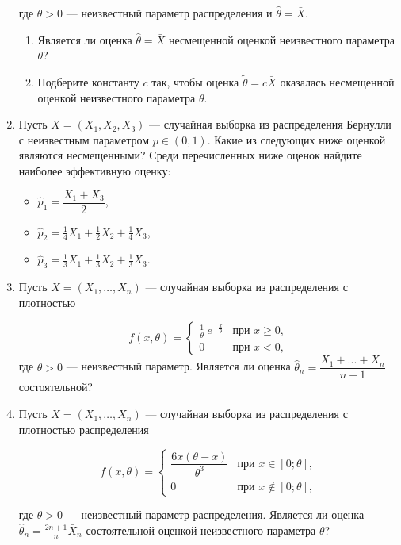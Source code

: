 \begin{enumerate}
где $\theta > 0$ — неизвестный параметр распределения и $\hat{\theta} = \bar{X}$.

\begin{enumerate}
\item Является ли оценка $\hat{\theta} = \bar{X}$ несмещенной оценкой неизвестного параметра $\theta$?
\item Подберите константу $c$ так, чтобы оценка $\tilde{\theta} = c\bar{X}$ оказалась несмещенной оценкой неизвестного параметра $\theta$.
\end{enumerate}

\item Пусть $X = (X_1,X_2,X_3)$ — случайная выборка из распределения Бернулли с неизвестным параметром $p \in (0,1)$. Какие из следующих ниже оценкой являются несмещенными? Среди перечисленных ниже оценок найдите наиболее эффективную оценку:

\begin{itemize}
  \item $\hat{p}_1 = \dfrac{X_1+X_3}{2}$,
  \item $\hat{p}_2 = \frac{1}{4}X_1+\frac{1}{2}X_2+\frac{1}{4}X_3$,
  \item $\hat{p}_3 = \frac{1}{3}X_1+\frac{1}{3}X_2+\frac{1}{3}X_3$.
\end{itemize}

\item Пусть $X=(X_1, \ldots,X_n)$ — случайная выборка из распределения с плотностью

\[
f(x,\theta) =
\begin{cases}
\frac{1}{\theta} \ e^{-\frac{x}{\theta}} & \text{при } x \geq 0, \\
0 & \text{при } x < 0,
\end{cases}
\]
где $\theta > 0$ — неизвестный параметр.
Является ли оценка  $\hat{\theta}_n = \dfrac{X_1+...+X_n}{n+1}$ состоятельной?

\item Пусть $X=(X_1, \ldots ,X_n)$ — случайная выборка из распределения с плотностью распределения

\[
f(x,\theta) = \begin{cases}
\dfrac{6x(\theta-x)}{\theta^3} & \text{при } x \in [0;\theta], \\
0 & \text{при } x \not\in [0;\theta], \end{cases}
\]


где $\theta > 0$ — неизвестный параметр распределения. Является ли оценка \ $\hat{\theta}_n = \frac{2n+1}{n}\bar{X}_n$ состоятельной оценкой неизвестного параметра $\theta$?


\end{enumerate}
